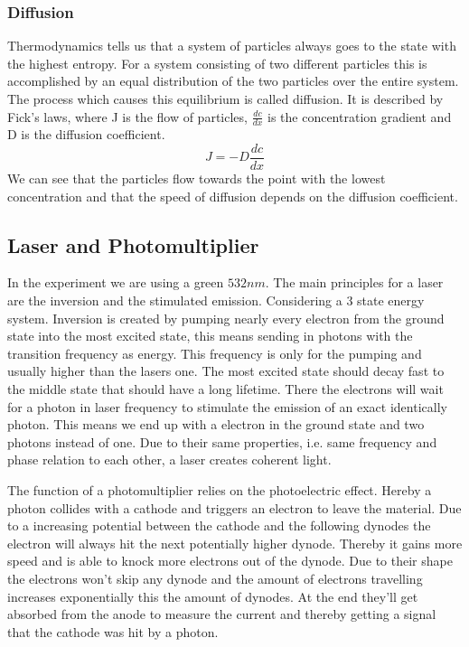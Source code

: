 \documentclass[]{article}
\begin{document}
\subsubsection{Diffusion}
Thermodynamics tells us that a system of particles always goes to the state with the highest entropy. For a system consisting of two different particles this is accomplished by an equal distribution of the two particles over the entire system. The process which causes this equilibrium is called diffusion. It is described by Fick's laws, where J is the flow of particles, $\frac{dc}{dx} $ is the concentration gradient and D is the diffusion coefficient. 
\[ J=-D\frac{dc}{dx}\]
We can see that the particles flow towards the point with the lowest concentration and that the speed of diffusion depends on the diffusion coefficient.

\subsection{Laser and Photomultiplier}
In the experiment we are using a green $532nm$. The main principles for a laser are the inversion and the stimulated emission. Considering a 3 state energy system. Inversion is created by pumping nearly every electron from the ground state into the most excited state, this means sending in photons with the transition frequency as energy. This frequency is only for the pumping and usually higher than the lasers one. The most excited state should decay fast to the middle state that should have a long lifetime. There the electrons will wait for a photon in laser frequency to stimulate the emission of an exact identically photon. This means we end up with a electron in the ground state and two photons instead of one. Due to their same properties, i.e. same frequency and phase relation to each other, a laser creates coherent light.

The function of a photomultiplier relies on the photoelectric effect. Hereby a photon collides with a cathode and triggers an electron to leave the material.
Due to a increasing potential between the cathode and the following dynodes the electron will always hit the next potentially higher dynode. Thereby it gains more speed and is able to knock more electrons out of the dynode. Due to their shape the electrons won't skip any dynode and the amount of electrons travelling increases exponentially this the amount of dynodes. At the end they'll get absorbed from the anode to measure the current and thereby getting a signal that the cathode was hit by a photon.
\end{document}
